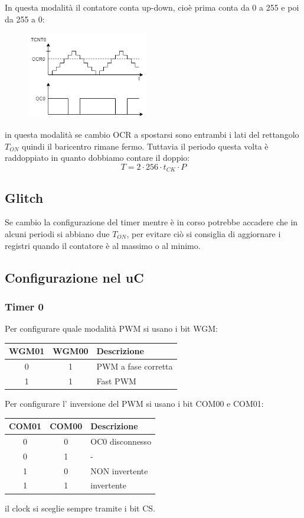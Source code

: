 In questa modalità il contatore conta up-down, cioè prima conta da 0 a 255 e poi da 255 a 0:
\begin{figure}[H]
    \centering
    \includegraphics[width=200px]{images/19_PWM/phase_correct_pwm.png}
\end{figure}
in questa modalità se cambio OCR a spostarsi sono entrambi i lati del rettangolo $T_{ON}$ quindi il baricentro rimane fermo.
Tuttavia il periodo questa volta è raddoppiato in quanto dobbiamo contare il doppio:
$$ T = 2 \cdot 256 \cdot t_{CK} \cdot P $$

\subsection{Glitch}
Se cambio la configurazione del timer mentre è in corso potrebbe accadere che in alcuni periodi si abbiano due $T_{ON}$, per evitare ciò si consiglia di aggiornare i registri quando il contatore è al massimo o al minimo.

\subsection{Configurazione nel uC}
\subsubsection{Timer 0}
Per configurare quale modalità PWM si usano i bit WGM:
\begin{table}[H]
    \centering
    \begin{tabular}{c c | l}
        WGM01 & WGM00 & Descrizione \\
        \hline
        0 & 1 & PWM a fase corretta \\
        \hline
        1 & 1 & Fast PWM \\
        \hline
    \end{tabular}
\end{table}
Per configurare l' inversione del PWM si usano i bit COM00 e COM01:
\begin{table}[H]
    \centering
    \begin{tabular}{c c | l}
        COM01 & COM00 & Descrizione \\
        \hline
        0 & 0 & OC0 disconnesso \\
        \hline
        0 & 1 & - \\
        \hline
        1 & 0 & NON invertente \\
        \hline
        1 & 1 & invertente \\
        \hline
    \end{tabular}
\end{table}
il clock si sceglie sempre tramite i bit CS.

